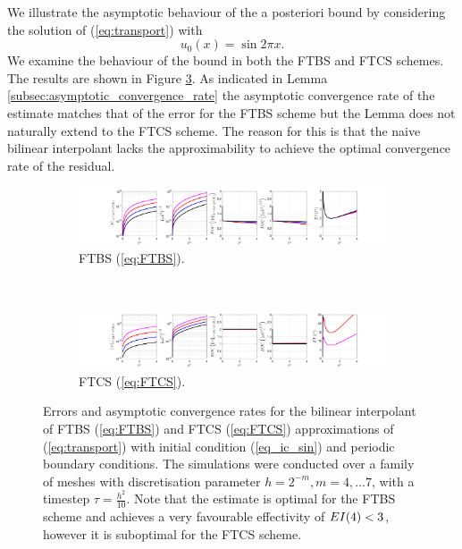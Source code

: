 \documentclass[final]{amsart}
\numberwithin{equation}{section}
\begin{document}
We illustrate the asymptotic behaviour of the a posteriori bound by
considering the solution of (\ref{eq:transport}) with
\begin{equation}
  \label{eq_ic_sin}
  u_0(x) = \sin{2\pi x}.
\end{equation}
We examine the behaviour of the bound in both the FTBS and FTCS
schemes. The results are shown in Figure
\ref{fig:bilinearLagrange}. As indicated in Lemma
\ref{subsec:asymptotic_convergence_rate} the asymptotic convergence
rate of the estimate matches that of the error for the FTBS scheme but
the Lemma does not naturally extend to the FTCS scheme. The reason for
this is that the naive bilinear interpolant lacks the approximability
to achieve the optimal convergence rate of the residual.
\begin{figure}[H]
	\begin{subfigure}[b]{\textwidth}
		\includegraphics[width=\textwidth]{../figures/fig_FTBSplots_1x5_sin_IC_ind_uniform_P1}	
		\caption{
			\label{sfig:FTBS_prelim}
			FTBS (\ref{eq:FTBS}).
		}
	\end{subfigure}
	\\
	\begin{subfigure}[b]{\textwidth}
		\includegraphics[width=\textwidth]{../figures/fig_FTCSplots_1x5_sin_IC_uniform_P1_ind}	
		\caption{\label{sfig:FTCS_prelim_P1}
			FTCS (\ref{eq:FTCS}).
		}
	\end{subfigure}
	\caption{\label{fig:bilinearLagrange} Errors and asymptotic
          convergence rates for the bilinear interpolant of FTBS
          (\ref{eq:FTBS}) and FTCS (\ref{eq:FTCS}) approximations of
          (\ref{eq:transport}) with initial condition
          (\ref{eq_ic_sin}) and periodic boundary conditions. The
          simulations were conducted over a family of meshes with
          discretisation parameter $h = 2^{-m}, m = 4,\dots 7$, with a
          timestep $\tau = \tfrac{h^2}{10}$. Note that the estimate is
          optimal for the FTBS scheme and achieves a very favourable
          effectivity of $EI \!\left({4}\right) < 3$, however it is suboptimal for
          the FTCS scheme.  }
\end{figure}
\end{document}
